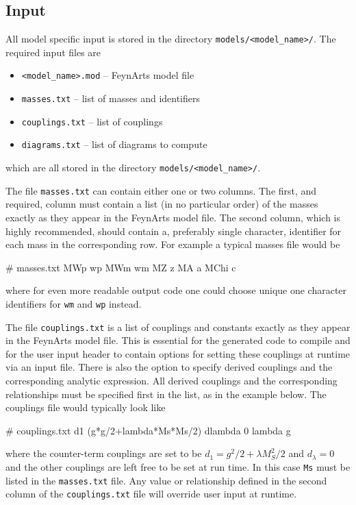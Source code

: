 \subsection{Input}

All model specific input is stored in the directory \lstinline{models/<model_name>/}.  The required input files are
\begin{itemize}
\item \lstinline{<model_name>.mod}  -- FeynArts model file
\item \lstinline{masses.txt} -- list of masses and identifiers
\item \lstinline{couplings.txt} -- list of couplings
\item \lstinline{diagrams.txt} -- list of diagrams to compute
\end{itemize}
which are all stored in the directory \lstinline{models/<model_name>/}.

The file \lstinline{masses.txt} can contain either one or two columns.  The first, and required, column must contain a list (in no particular order) of the masses exactly as they appear in the FeynArts model file.  The second column, which is highly recommended, should contain a, preferably single character, identifier for each mass in the corresponding row.  For example a typical masses file would be
\begin{lstterm}
# masses.txt
MWp          wp
MWm          wm
MZ           z
MA           a
MChi	       c
\end{lstterm}
where for even more readable output code one could choose unique one character identifiers for \lstinline{wm} and \lstinline{wp} instead.

The file \lstinline{couplings.txt} is a list of couplings and constants exactly as they appear in the FeynArts model file.  This is essential for the generated code to compile and for the user input header to contain options for setting these couplings at runtime via an input file.  There is also the option to specify derived couplings and the corresponding analytic expression.  All derived couplings and the corresponding relationships must be specified first in the list, as in the example below.  The couplings file would typically look like
\begin{lstterm}
# couplings.txt
d1 (g*g/2+lambda*Ms*Ms/2)
dlambda 0
lambda
g
\end{lstterm}
where the counter-term couplings are set to be $d_1=g^2/2 + \lambda M_S^2/2$ and $d_{\lambda}=0$ and the other couplings are left free to be set at run time.  In this case \lstinline{Ms} must be listed in the \lstinline{masses.txt} file.  Any value or relationship defined in the second column of the \lstinline{couplings.txt} file will override user input at runtime.

